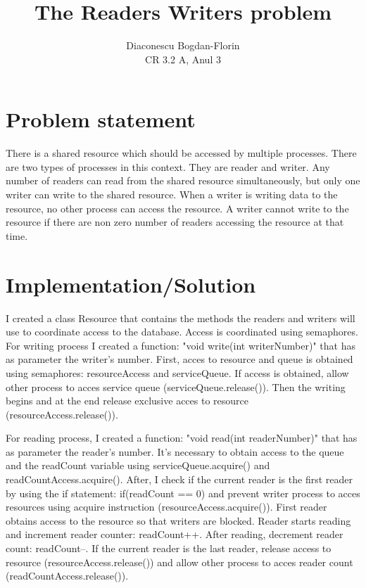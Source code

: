 \documentclass{article}
\title{The Readers Writers problem}
\author{Diaconescu Bogdan-Florin\\ CR 3.2 A, Anul 3}
\begin{document}
\maketitle
\newpage
\section{Problem statement}
\hspace{0.5 cm}
There is a shared resource which should be accessed by multiple processes. There are two types of processes in this context. They are reader and writer. Any number of readers can read from the shared resource simultaneously, but only one writer can write to the shared resource. When a writer is writing data to the resource, no other process can access the resource. A writer cannot write to the resource if there are non zero number of readers accessing the resource at that time.

\section{Implementation/Solution}
\hspace{0.5 cm}
I created a class Resource that contains the methods the readers and writers will use to coordinate access to the database. Access is coordinated using semaphores. For writing process I created a function: "void write(int writerNumber)" that has as parameter the writer's number. First, acces to resource and queue is obtained using semaphores: resourceAccess and serviceQueue. If access is obtained, allow other process to acces service queue (serviceQueue.release()). Then the writing begins and at the end release exclusive acces to resource (resourceAccess.release()).

\hspace{0.5 cm}
For reading process, I created a function: "void read(int readerNumber)" that has as parameter the reader's number. It's necessary to obtain access to the queue and the readCount variable using serviceQueue.acquire() and readCountAccess.acquire(). After, I check if the current reader is the first reader by using the if statement: if(readCount == 0) and prevent writer process to acces resources using acquire instruction (resourceAccess.acquire()). First reader obtains access to the resource so that writers are blocked. Reader starts reading and increment reader counter: readCount++. After reading, decrement reader count: readCount--. If the current reader is the last reader, release access to resource (resourceAccess.release()) and allow other process to acces reader count (readCountAccess.release()).
\end{document}

